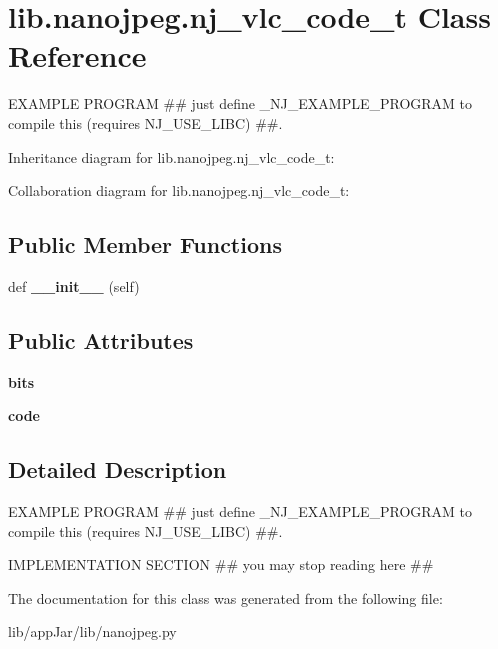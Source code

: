 \hypertarget{classlib_1_1nanojpeg_1_1nj__vlc__code__t}{}\section{lib.\+nanojpeg.\+nj\+\_\+vlc\+\_\+code\+\_\+t Class Reference}
\label{classlib_1_1nanojpeg_1_1nj__vlc__code__t}


E\+X\+A\+M\+P\+LE P\+R\+O\+G\+R\+AM \#\# just define \+\_\+\+N\+J\+\_\+\+E\+X\+A\+M\+P\+L\+E\+\_\+\+P\+R\+O\+G\+R\+AM to compile this (requires N\+J\+\_\+\+U\+S\+E\+\_\+\+L\+I\+BC) \#\#.  




Inheritance diagram for lib.\+nanojpeg.\+nj\+\_\+vlc\+\_\+code\+\_\+t\+:


Collaboration diagram for lib.\+nanojpeg.\+nj\+\_\+vlc\+\_\+code\+\_\+t\+:
\subsection*{Public Member Functions}
\begin{DoxyCompactItemize}
\item 
\mbox{\label{classlib_1_1nanojpeg_1_1nj__vlc__code__t_a60d0564207f05582518004022e68185e}} 
def {\bfseries \+\_\+\+\_\+init\+\_\+\+\_\+} (self)
\end{DoxyCompactItemize}
\subsection*{Public Attributes}
\begin{DoxyCompactItemize}
\item 
\mbox{\label{classlib_1_1nanojpeg_1_1nj__vlc__code__t_a48053e9618ce59c2764ef4f5ce6ac551}} 
{\bfseries bits}
\item 
\mbox{\label{classlib_1_1nanojpeg_1_1nj__vlc__code__t_ad2084f8fad2ad86db83847d396824834}} 
{\bfseries code}
\end{DoxyCompactItemize}


\subsection{Detailed Description}
E\+X\+A\+M\+P\+LE P\+R\+O\+G\+R\+AM \#\# just define \+\_\+\+N\+J\+\_\+\+E\+X\+A\+M\+P\+L\+E\+\_\+\+P\+R\+O\+G\+R\+AM to compile this (requires N\+J\+\_\+\+U\+S\+E\+\_\+\+L\+I\+BC) \#\#. 

I\+M\+P\+L\+E\+M\+E\+N\+T\+A\+T\+I\+ON S\+E\+C\+T\+I\+ON \#\# you may stop reading here \#\# 

The documentation for this class was generated from the following file\+:\begin{DoxyCompactItemize}
\item 
lib/app\+Jar/lib/nanojpeg.\+py\end{DoxyCompactItemize}
